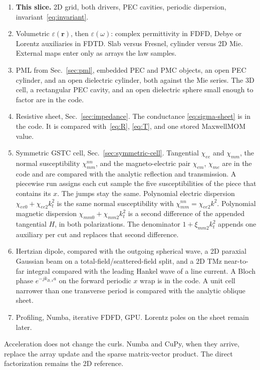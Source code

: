 \documentclass[11pt,a4paper]{article}
\numberwithin{equation}{section}
\begin{document}
\begin{enumerate}
\item \textbf{This slice.} 2D grid, both drivers, PEC cavities, periodic
dispersion, invariant~\eqref{eq:invariant}.
\item Volumetric $\varepsilon(\mathbf{r})$, then $\varepsilon(\omega)$: complex
permittivity in FDFD, Debye or Lorentz auxiliaries in FDTD. Slab versus
Fresnel, cylinder versus 2D Mie. External maps enter only as arrays the law
samples.
\item PML from Sec.~\ref{sec:pml}, embedded PEC and PMC objects, an open
PEC cylinder, and an open dielectric cylinder, both against the Mie
series. The 3D cell, a rectangular PEC cavity, and an open dielectric
sphere small enough to factor are in the code.
\item Resistive sheet, Sec.~\ref{sec:impedance}. The conductance
\eqref{eq:sigma-sheet} is in the code. It is compared with~\eqref{eq:R},
\eqref{eq:T}, and one stored MaxwellMOM value.
\item Symmetric GSTC cell, Sec.~\ref{sec:symmetric-cell}. Tangential
$\chi_{ee}$ and $\chi_{mm}$, the normal susceptibility
$\chi_{mm}^{nn}$, and the magneto-electric pair $\chi_{em}$, $\chi_{me}$
are in the code and are compared with the analytic reflection and
transmission. A piecewise run assigns each cut sample the five
susceptibilities of the piece that contains its $x$. The jumps stay
the same. Polynomial electric dispersion $\chi_{ee0}+\chi_{ee2}k_t^2$
is the same normal susceptibility with $\chi_{mm}^{nn}=\chi_{ee2}k^2$.
Polynomial magnetic dispersion $\chi_{mm0}+\chi_{mm2}k_t^2$ is a
second difference of the appended tangential $H$, in both polarizations.
The denominator $1+\xi_{mm2}k_t^2$ appends one auxiliary per cut and
replaces that second difference.
\item Hertzian dipole, compared with the outgoing spherical wave, a
2D paraxial Gaussian beam on a total-field/scattered-field split, and a
2D TMz near-to-far integral compared with the leading Hankel wave of a
line current. A Bloch phase $e^{-j k_{B,x} a}$ on the forward periodic
$x$ wrap is in the code. A unit cell narrower than one transverse period
is compared with the analytic oblique sheet.
\item Profiling, Numba, iterative FDFD, GPU. Lorentz poles on the sheet
remain later.
\end{enumerate}

Acceleration does not change the curls. Numba and CuPy, when they arrive,
replace the array update and the sparse matrix-vector product. The direct
factorization remains the 2D reference.
\end{document}
